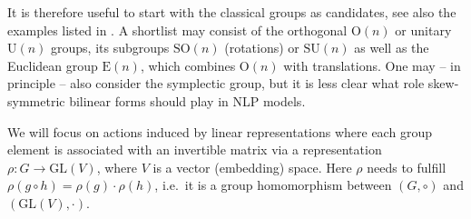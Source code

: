 \documentclass{article}
\begin{document}
It is therefore useful to start with the classical groups \cite{weyl1946classical} as candidates, see also the examples listed in \cite[Section 2.2]{hall2015lie}. A shortlist may consist of the orthogonal $\text{O}(n)$ or unitary $\text{U}(n)$ groups, its subgroups $\text{SO}(n)$ (rotations) or  $\text{SU}(n)$ as well as the Euclidean group $\text{E}(n)$, which combines $\text{O}(n)$ with translations. One may -- in principle -- also consider the symplectic group, but it is less clear what role skew-symmetric bilinear forms should play in NLP models. 





\newpage


We will focus on actions induced by linear representations where each group element is associated with an invertible matrix  via a representation $\rho: G \to \text{GL}(V)$, where $V$ is a vector (embedding) space. Here $\rho$ needs to fulfill $\rho(g \circ h) = \rho(g) \cdot \rho(h)$, i.e.~it is a group homomorphism between $(G, \circ)$ and $(\text{GL}(V),\cdot)$. 




\end{document}

